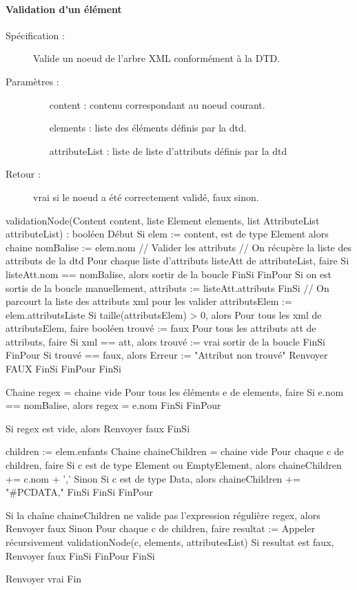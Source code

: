 \documentclass[10pt,a4paper]{article}
\begin{document}
\paragraph{Validation d'un élément}
\begin{description}
\item[Spécification :] Valide un noeud de l’arbre XML conformément à la DTD.
\item[Paramètres :]
\begin{itemize}
\item[content] : contenu correspondant au noeud courant.
\item[elements] : liste des éléments définis par la dtd.
\item[attributeList] : liste de liste d’attributs définis par la dtd
\end{itemize}
\item[Retour :] vrai si le noeud a été correctement validé, faux sinon.
\end{description}

\begin{verbatimtab}
validationNode(Content content, liste Element elements, list AttributeList attributeList) : booléen
Début
Si elem := content, est de type Element alors
	chaine nomBalise := elem.nom
	// Valider les attributs
	// On récupère la liste des attributs de la dtd
	Pour chaque liste d'attributs listeAtt de attributeList, faire
		Si listeAtt.nom == nomBalise, alors
			sortir de la boucle
		FinSi
	FinPour	
	Si on est sortis de la boucle manuellement,
		attributs := listeAtt.attributs
	FinSi
	// On parcourt la liste des attributs xml pour les valider
	attributsElem := elem.attributsListe
	Si taille(attributsElem) > 0, alors
		Pour tous les xml de attributsElem, faire
			booléen trouvé := faux
			Pour tous les attributs att de attributs, faire
				Si xml == att, alors
					trouvé := vrai
					sortir de la boucle
				FinSi
			FinPour
			Si trouvé == faux, alors
				Erreur := "Attribut non trouvé"
				Renvoyer FAUX
			FinSi
		FinPour
	FinSi
		
	Chaine regex = chaine vide
	Pour tous les éléments e de elements, faire
		Si e.nom == nomBalise, alors
			regex = e.nom
		FinSi
	FinPour
		
	Si regex est vide, alors
		Renvoyer faux
	FinSi
		
	children := elem.enfants
	Chaine chaineChildren = chaine vide
	Pour chaque c de children, faire
		Si c est de type Element ou EmptyElement, alors
			chaineChildren += c.nom + ','
		Sinon
			Si c est de type Data, alors
				chaineChildren += "#PCDATA,"
			FinSi
		FinSi
	FinPour

	Si la chaîne chaineChildren ne valide pas l'expression régulière regex, alors
		Renvoyer faux
    	Sinon
    		Pour chaque c de children, faire
    			resultat := Appeler récursivement validationNode(c, elements, attributesList)
    			Si resultat est faux,
    				Renvoyer faux
    			FinSi
    		FinPour
    	FinSi
    	
    	Renvoyer vrai
Fin
\end{verbatimtab}
\end{document}
